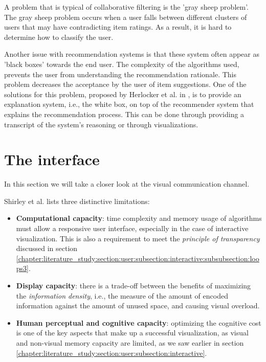 
A problem that is typical of collaborative filtering is the 'gray sheep problem'\cite{burke:2002, herlocker:2000}. The gray sheep problem occurs when a user falls between different clusters of users that may have contradicting item ratings. As a result, it is hard to determine how to classify the user\cite{burke:2002}.


Another issue with recommendation systems is that these system often appear as 'black boxes' towards the end user. The complexity of the algorithms used, prevents the user from understanding the recommendation rationale\cite{zhao:2010}. This problem decreases the acceptance by the user of item suggestions. One of the solutions for this problem, proposed by Herlocker et al. in \cite{herlocker:2000}, is to provide an explanation system, i.e., the white box, on top of the recommender system that explains the recommendation process. This can be done through providing a transcript of the system's reasoning or through visualizations\cite{herlocker:2000}.






% 
\section{The interface}\label{chapter:literature_study:section:interaction}

In this section we will take a closer look at the visual communication channel.

Shirley et al.\cite{shirley:2009} lists three distinctive limitations:

\begin{itemize}
	\item \textbf{Computational capacity}: time complexity and memory usage of algorithms must allow a responsive user interface, especially in the case of interactive visualization. This is also a requirement to meet the \emph{principle of transparency} discussed in section \ref{chapter:literature_study:section:user:subsection:interactive:subsubsection:loops3}.
	\item \textbf{Display capacity}: there is a trade-off between the benefits of maximizing the \emph{information density}, i.e., the measure of the amount of encoded information against the amount of unused space, and causing visual overload.
	\item \textbf{Human perceptual and cognitive capacity}: optimizing the cognitive cost is one of the key aspects that make up a successful visualization, as visual and non-visual memory capacity are limited\cite{ware:2004}, as we saw earlier in section \ref{chapter:literature_study:section:user:subsection:interactive}.
\end{itemize}

